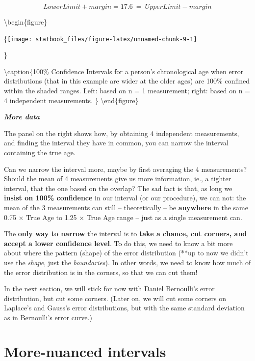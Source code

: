 \documentclass[]{book}
\begin{document}
\[ LowerLimit + margin  = 17.6 \ = \   UpperLimit - margin  \]

\textbackslash{}begin\{figure\}

\{\centering \texttt{[image: statbook\_files/figure-latex/unnamed-chunk-9-1]}

\}

\textbackslash{}caption\{100\% Confidence Intervals for a person's chronological age when error distributions (that in this example are wider at the older ages) are 100\% confined within the shaded ranges. Left: based on n = 1 measurement; right: based on n = 4 independent measurements. \}\label{fig:unnamed-chunk-9}
\textbackslash{}end\{figure\}

\textbf{\emph{More data}}

The panel on the right shows how, by obtaining 4 independent measurements, and finding the interval they have in common, you can narrow the interval containing the true age.

Can we narrow the interval more, maybe by first averaging the 4 measurements? Should the mean of 4 measurements give us more information, ie., a tighter interval, that the one based on the overlap? The sad fact is that, as long we \textbf{insist on 100\% confidence} in our interval (or our procedure), we can not: the mean of the 3 measurements can still -- theoretically -- be \textbf{anywhere} in the same 0.75 \(\times\) True Age to 1.25 \(\times\) True Age range -- just as a single measurement can.

The \textbf{only way to narrow} the interval is to \textbf{take a chance, cut corners, and accept a lower confidence level}. To do this, we need to know a bit more about where the pattern (shape) of the error distribution (**up to now we didn't use the \emph{shape}, just the \emph{boundaries}). In other words, we need to know how much of the error distribution is in the corners, so that we can cut them!

In the next section, we will stick for now with Daniel Bernoulli's error distribution, but cut some corners. (Later on, we will cut some corners on Laplace's and Gauss's error distributions, but with the same standard deviation as in Bernoulli's error curve.)

\hypertarget{more-nuanced-intervals}{%
\section{More-nuanced intervals}\label{more-nuanced-intervals}}
\end{document}
